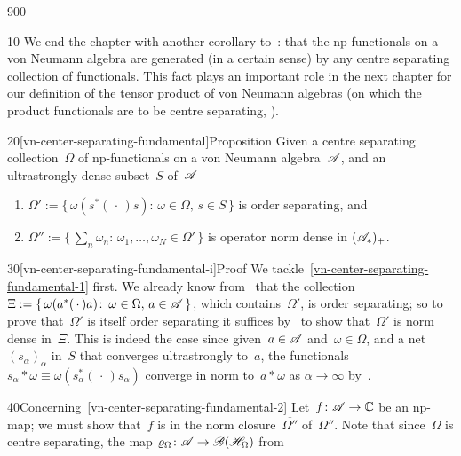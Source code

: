 \begin{parsec}{900}%
\begin{point}{10}%
We end the chapter 
with another corollary to~:
 that  the np-functionals
on a von Neumann algebra
are generated (in a certain sense)
by any centre separating collection
of functionals. This fact plays
an important role
in the next chapter
for our definition of the tensor product
of von Neumann algebras
(on which the product functionals are to be centre separating,
).
\end{point}
\begin{point}{20}[vn-center-separating-fundamental]{Proposition}%
Given a centre separating collection~$\Omega$ of np-functionals
on a von Neumann algebra~$\mathscr{A}$,
and an ultrastrongly dense subset~$S$ of~$\mathscr{A}$
\begin{enumerate}
\item
	\label{vn-center-separating-fundamental-1}
$\Omega':= \{\,\omega(s^*(\,\cdot\,)s)\colon\,
\omega\in\Omega,\,s\in S\,\}$
is order separating, and
\item
	\label{vn-center-separating-fundamental-2}
$\Omega'':=\{\,\sum_n\omega_n\colon\, \omega_1,\dotsc,\omega_N\in\Omega'\,\}$ is operator norm dense in $(\mathscr{A}_*)_+$.
\end{enumerate}
\spacingfix%
\begin{point}{30}[vn-center-separating-fundamental-i]{Proof}%
We tackle~\ref{vn-center-separating-fundamental-1}
first. We already know from~
that the collection $\Xi:=\{\, \omega(a^*(\,\cdot\,)a)\colon\, 
\omega\in\Omega,\, a\in\mathscr{A}\,\}$,
which contains~$\Omega'$, is order separating;
so to prove that~$\Omega'$ is itself order separating
it suffices by~ to show that~$\Omega'$
is norm dense in~$\Xi$.
This is indeed the case
since given~$a\in\mathscr{A}$
and~$\omega\in\Omega$,
and a net~$(s_\alpha)_\alpha$ in~$S$
that converges ultrastrongly to~$a$,
the functionals~$s_\alpha \ast\omega
\equiv \omega(s_\alpha^*(\,\cdot\,)s_\alpha)$
converge in norm to~$a\ast \omega$
as $\alpha\to\infty$
by~.%
\begin{point}{40}{Concerning~\ref{vn-center-separating-fundamental-2}}%
Let~$f\colon \mathscr{A}\to\mathbb{C}$ be an np-map;
we must show that~$f$ is in 
the norm closure~$\overline{\Omega''}$ of~$\Omega''$.
Note that since~$\Omega$ is centre separating,
the map $\varrho_\Omega\colon \mathscr{A}\to\mathscr{B}(\mathscr{H}_\Omega)$
from~

\end{point}
\end{point}
\end{point}
\end{parsec}
